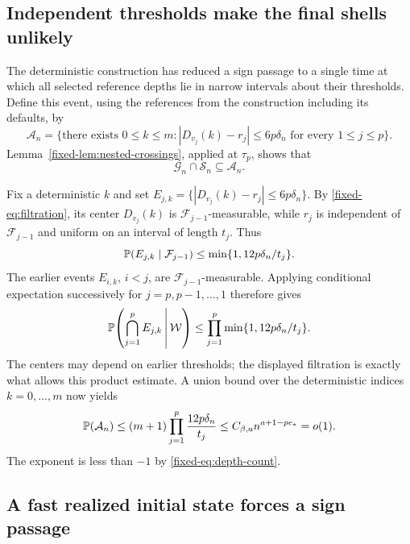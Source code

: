 \subsection{Independent thresholds make the final shells unlikely}
\label{fixed-subsec:threshold-estimate}

The deterministic construction has reduced a sign passage to a single
time at which all selected reference depths lie in narrow intervals
about their thresholds. Define this event, using the references from
the construction including its defaults, by
\begin{equation}\label{fixed-eq:shell-event}
 \mathcal A_n=
 \{\text{there exists }0\le k\le m:
       |D_{v_j}(k)-r_j|\le6p\delta_n
       \text{ for every }1\le j\le p\}.
\end{equation}
Lemma~\ref{fixed-lem:nested-crossings}, applied at $\tau_p$, shows that
\begin{equation}\label{fixed-eq:sign-implies-shells}
 \mathcal G_n\cap\mathcal S_n\subseteq\mathcal A_n.
\end{equation}

Fix a deterministic $k$ and set
$E_{j,k}=\{|D_{v_j}(k)-r_j|\le6p\delta_n\}$.
By \eqref{fixed-eq:filtration}, its center $D_{v_j}(k)$ is
$\mathcal F_{j-1}$-measurable, while $r_j$ is independent of
$\mathcal F_{j-1}$ and uniform on an interval of length $t_j$.
Thus
\begin{equation}\label{fixed-eq:one-threshold-bound}
 \mathbb P(E_{j,k}\mid\mathcal F_{j-1})
 \le\min\{1,12p\delta_n/t_j\}.
\end{equation}
The earlier events $E_{i,k}$, $i<j$, are
$\mathcal F_{j-1}$-measurable. Applying conditional expectation
successively for $j=p,p-1,\ldots,1$ therefore gives
\[
 \mathbb P\!\left(\bigcap_{j=1}^pE_{j,k}\,\middle|\,\mathcal W\right)
 \le\prod_{j=1}^p\min\{1,12p\delta_n/t_j\}.
\]
The centers may depend on earlier thresholds; the displayed filtration
is exactly what allows this product estimate. A union bound over the
deterministic indices $k=0,\ldots,m$ now yields
\begin{equation}\label{fixed-eq:simultaneous-shell-bound}
 \mathbb P(\mathcal A_n)
 \le(m+1)\prod_{j=1}^p\frac{12p\delta_n}{t_j}
 \le C_{\beta,a}n^{a+1-pe_*}=o(1).
\end{equation}
The exponent is less than $-1$ by \eqref{fixed-eq:depth-count}.

\subsection{A fast realized initial state forces a sign passage}
\label{fixed-subsec:tv-conclusion}

